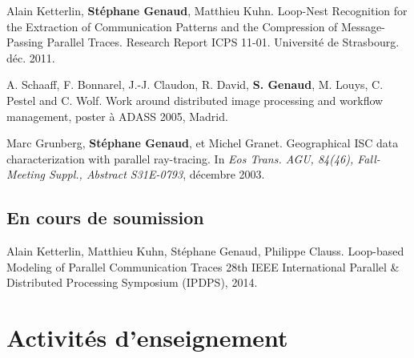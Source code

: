 \begin{thebibliography}{99}
Alain Ketterlin, \textbf{Stéphane Genaud}, Matthieu Kuhn.
\newblock Loop-Nest Recognition for the Extraction of Communication Patterns 
and the Compression of Message-Passing Parallel Traces.
\newblock Research Report ICPS 11-01. Université de Strasbourg. déc. 2011.


A. Schaaff, F. Bonnarel, J.-J. Claudon, R. David, \textbf{S. Genaud}, M. Louys, 
C. Pestel and C. Wolf.
\newblock Work around distributed image processing and workflow management, 
\newblock poster à ADASS 2005, Madrid.


Marc Grunberg, \textbf{Stéphane Genaud}, et Michel Granet.
\newblock Geographical {ISC} data characterization with parallel ray-tracing.
\newblock In {\em Eos Trans. AGU, 84(46), Fall-Meeting Suppl., Abstract
  S31E-0793}, décembre 2003.


\subsection*{En cours de soumission}


Alain Ketterlin, Matthieu Kuhn, Stéphane Genaud, Philippe Clauss.
\newblock Loop-based Modeling of Parallel Communication Traces
\newblock 28th IEEE International Parallel \& Distributed Processing Symposium (IPDPS),
2014.

\end{thebibliography}
\bigskip
{}


\section{Activités d'enseignement}

\label{sc:ensgnt-univ}

